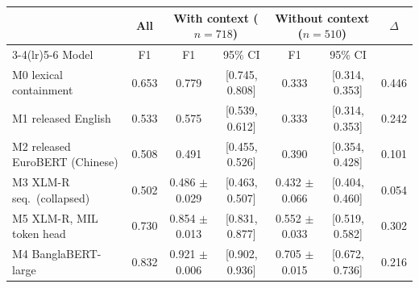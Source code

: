\begin{tabular}{@{}lcccccc@{}}
\toprule
 & All & \multicolumn{2}{c}{With context ($n{=}718$)} & \multicolumn{2}{c}{Without context ($n{=}510$)} & $\Delta$ \\
\cmidrule(lr){3-4}\cmidrule(lr){5-6}
Model & F1 & F1 & 95\% CI & F1 & 95\% CI & \\
\midrule
M0 lexical containment & 0.653 & 0.779 & [0.745, 0.808] & 0.333 & [0.314, 0.353] & 0.446 \\
M1 released English & 0.533 & 0.575 & [0.539, 0.612] & 0.333 & [0.314, 0.353] & 0.242 \\
M2 released EuroBERT (Chinese) & 0.508 & 0.491 & [0.455, 0.526] & 0.390 & [0.354, 0.428] & 0.101 \\
M3 XLM-R seq.\ (collapsed) & 0.502 & 0.486 $\pm$ 0.029 & [0.463, 0.507] & 0.432 $\pm$ 0.066 & [0.404, 0.460] & 0.054 \\
M5 XLM-R, MIL token head & 0.730 & 0.854 $\pm$ 0.013 & [0.831, 0.877] & 0.552 $\pm$ 0.033 & [0.519, 0.582] & 0.302 \\
M4 BanglaBERT-large & 0.832 & 0.921 $\pm$ 0.006 & [0.902, 0.936] & 0.705 $\pm$ 0.015 & [0.672, 0.736] & 0.216 \\
\bottomrule
\end{tabular}